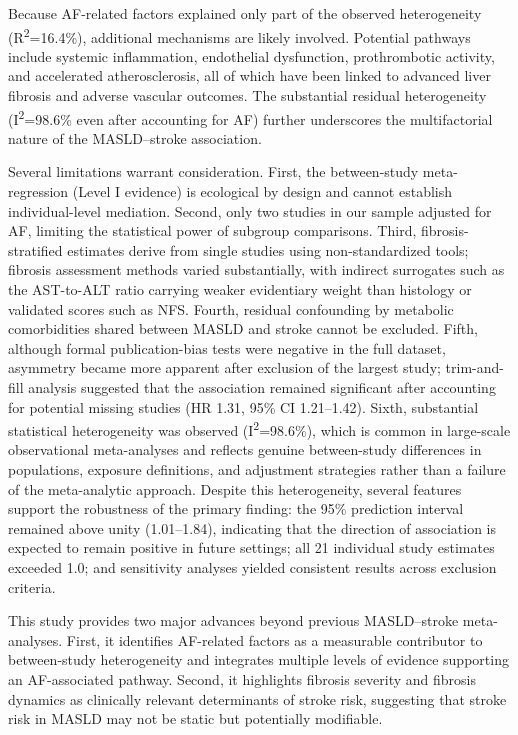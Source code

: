 \documentclass[12pt,a4paper]{article}
\begin{document}
Because AF-related factors explained only part of the observed heterogeneity (R\textsuperscript{2}=16.4\%), additional mechanisms are likely involved. Potential pathways include systemic inflammation, endothelial dysfunction, prothrombotic activity, and accelerated atherosclerosis, all of which have been linked to advanced liver fibrosis and adverse vascular outcomes. The substantial residual heterogeneity (I\textsuperscript{2}=98.6\% even after accounting for AF) further underscores the multifactorial nature of the MASLD--stroke association.

Several limitations warrant consideration. First, the between-study meta-regression (Level I evidence) is ecological by design and cannot establish individual-level mediation. Second, only two studies in our sample adjusted for AF, limiting the statistical power of subgroup comparisons. Third, fibrosis-stratified estimates derive from single studies using non-standardized tools; fibrosis assessment methods varied substantially, with indirect surrogates such as the AST-to-ALT ratio carrying weaker evidentiary weight than histology or validated scores such as NFS. Fourth, residual confounding by metabolic comorbidities shared between MASLD and stroke cannot be excluded. Fifth, although formal publication-bias tests were negative in the full dataset, asymmetry became more apparent after exclusion of the largest study; trim-and-fill analysis suggested that the association remained significant after accounting for potential missing studies (HR 1.31, 95\% CI 1.21--1.42). Sixth, substantial statistical heterogeneity was observed (I\textsuperscript{2}=98.6\%), which is common in large-scale observational meta-analyses and reflects genuine between-study differences in populations, exposure definitions, and adjustment strategies rather than a failure of the meta-analytic approach. Despite this heterogeneity, several features support the robustness of the primary finding: the 95\% prediction interval remained above unity (1.01--1.84), indicating that the direction of association is expected to remain positive in future settings; all 21 individual study estimates exceeded 1.0; and sensitivity analyses yielded consistent results across exclusion criteria.

This study provides two major advances beyond previous MASLD--stroke meta-analyses. First, it identifies AF-related factors as a measurable contributor to between-study heterogeneity and integrates multiple levels of evidence supporting an AF-associated pathway. Second, it highlights fibrosis severity and fibrosis dynamics as clinically relevant determinants of stroke risk, suggesting that stroke risk in MASLD may not be static but potentially modifiable.
\end{document}
